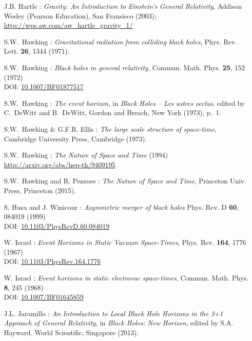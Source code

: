 \begin{thebibliography}{123}
J.B. Hartle : \emph{Gravity: An Introduction to Einstein's General Relativity},
Addison Wesley (Pearson Education), San Fransisco (2003); \\
\url{http://wps.aw.com/aw_hartle_gravity_1/}

S.W.~Hawking : {\em Gravitational radiation from colliding black holes},
Phys. Rev. Lett. {\bf 26}, 1344 (1971).

S.W.~Hawking : {\em Black holes in general relativity},
Commun. Math. Phys. {\bf 25}, 152 (1972)\\
DOI: \href{http://dx.doi.org/10.1007/BF01877517}{10.1007/BF01877517}

S.W.~Hawking : {\em The event horizon},
in {\em Black Holes -- Les astres occlus}, edited by C.~DeWitt and B.~DeWitt,
Gordon and Breach, New York (1973), p.~1.

S.W.~Hawking \& G.F.R. Ellis : {\em The large scale structure of
space-time},
Cambridge University Press, Cambridge (1973).

S.W.~Hawking : {\em The Nature of Space and Time} (1994)\\
\url{http://arxiv.org/abs/hep-th/9409195}

S.W.~Hawking and R. Penrose : {\em The Nature of Space and Time},
Princeton Univ. Press, Princeton (2015).

S. Husa and J. Winicour :
{\em Asymmetric merger of black holes}
Phys. Rev. D {\bf 60}, 084019 (1999)\\
DOI: \href{http://dx.doi.org/10.1103/PhysRevD.60.084019}{10.1103/PhysRevD.60.084019}

W. Israel : {\em Event Horizons in Static Vacuum Space-Times},
Phys. Rev. {\bf 164}, 1776 (1967)\\
DOI: \href{http://dx.doi.org/10.1103/PhysRev.164.1776}{10.1103/PhysRev.164.1776}

W. Israel : {\em Event horizons in static electrovac space-times},
Commun. Math. Phys. {\bf 8}, 245 (1968)\\
DOI: \href{http://dx.doi.org/10.1007/BF01645859}{10.1007/BF01645859}

J.L. Jaramillo : {\em An Introduction to Local Black Hole Horizons in the 3+1
Approach of General Relativity}, in {\em Black Holes: New Horizon}, edited
by S.A. Hayward, World Scientific, Singapore (2013).


\end{thebibliography}
